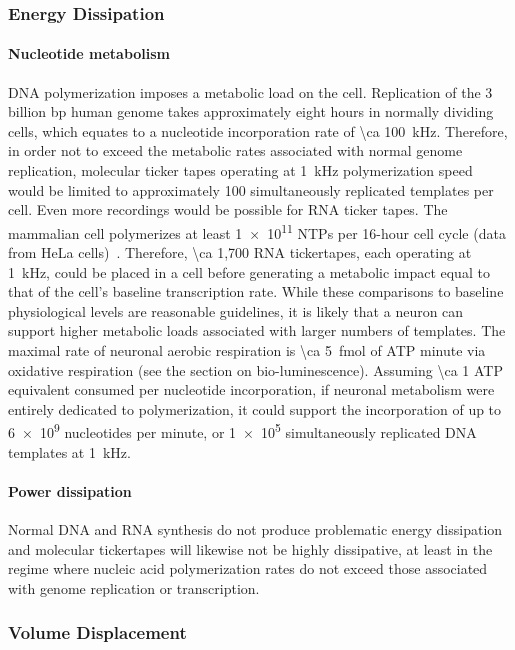 \subsubsection{Energy Dissipation}
\paragraph{Nucleotide metabolism}
DNA polymerization imposes a metabolic load on the cell.
Replication of the 3 billion bp human genome takes approximately eight hours in normally dividing cells, which equates to a nucleotide incorporation rate of \SI{\ca 100}{\kHz}.
Therefore, in order not to exceed the metabolic rates associated with normal genome replication, molecular ticker tapes operating at \SI{1}{\kHz} polymerization speed~\cite{kelman95} would be limited to approximately 100 simultaneously replicated templates per cell.
Even more recordings would be possible for RNA ticker tapes.
The mammalian cell polymerizes at least \num{1e11} NTPs per 16-hour cell cycle (data from HeLa cells)~\cite{jackson00}.
Therefore, \num{\ca 1,700} RNA tickertapes, each operating at \SI{1}{\kHz}, could be placed in a cell before generating a metabolic impact equal to that of the cell's baseline transcription rate.
While these comparisons to baseline physiological levels are reasonable guidelines, it is likely that a neuron can support higher metabolic loads associated with larger numbers of templates.
The maximal rate of neuronal aerobic respiration is \SI{\ca 5}{\femto\mole} of ATP minute via oxidative respiration (see the section on bio-luminescence). Assuming \num{\ca 1} ATP equivalent consumed per nucleotide incorporation, if neuronal metabolism were entirely dedicated to polymerization, it could support the incorporation of up to \num{6e9} nucleotides per minute, or \num{1e5} simultaneously replicated DNA templates at \SI{1}{\kHz}. %

\paragraph{Power dissipation}
Normal DNA and RNA synthesis do not produce problematic energy dissipation and molecular tickertapes will likewise not be highly dissipative, at least in the regime where nucleic acid polymerization rates do not exceed those associated with genome replication or transcription.

\subsubsection{Volume Displacement}

